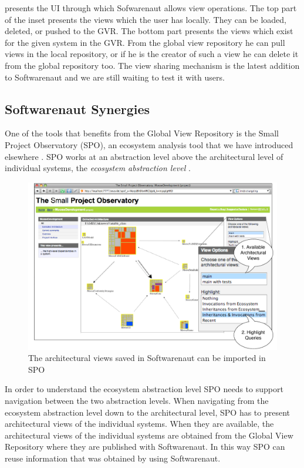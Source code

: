 \documentclass[preprint,12pt]{elsarticle}
\begin{document}
 presents the UI through which Sofwarenaut allows view operations. The top part of the inset presents the views which the user has locally. They can be loaded, deleted, or pushed to the GVR. The bottom part presents the views which exist for the given system in the GVR. From the global view repository he can pull views in the local repository, or if he is the creator of such a view he can delete it from the global repository too. The view sharing mechanism is the latest addition to Softwarenaut and we are still waiting to test it with users. 


\subsection {Softwarenaut Synergies}
One of the tools that benefits from the Global View Repository is the Small Project Observatory (SPO), an ecosystem analysis tool that we have introduced elsewhere \cite{lungu-est}. SPO works at an abstraction level above the architectural level of individual systems, the {\em ecosystem abstraction level} \cite{lungu-thesis}. 

\begin{figure}[th!]
\begin{center}
\includegraphics[width=0.7\linewidth]{images/SpoArchitectural}
\caption{The architectural views saved in Softwarenaut can be imported in SPO}
\label{}
\end{center}
\end{figure}

In order to understand the ecosystem abstraction level SPO needs to support navigation between the two abstraction levels. When navigating from the ecosystem abstraction level down to the architectural level, SPO has to present architectural views of the individual systems. When they are available, the architectural views of the individual systems are obtained from the Global View Repository where they are published with Softwarenaut. In this way SPO can reuse information that was obtained by using Softwarenaut.
\end{document}
